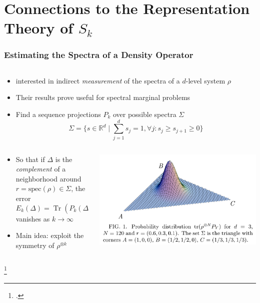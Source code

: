 \documentclass[
    9pt,
    hyperref={bookmarks=false, colorlinks=false}, %
    xcolor={dvipsnames},
]{beamer}
\DeclareMathOperator{\Tr}{Tr}
\begin{document}
\section{Connections to the Representation Theory of $S_k$}
\begin{frame}
    \frametitle{Estimating the Spectra of a Density Operator}
    \begin{columns}
        \begin{column}{\textwidth}
            \begin{itemize}
                \item \citeauthor{keyl2005estimating}\footnotemark{} interested in indirect \textit{measurement} of the spectra of a $d$-level system $\rho$
                \item Their results prove useful for spectral marginal problems
                \item Find a sequence projections $P_k$ over possible spectra $\Sigma$
                    \[ \Sigma = \{ s \in \mathbb R^d \mid \sum_{j=1}^{d} s_j = 1, \forall j : s_j \geq s_{j+1} \geq 0\} \]
            \end{itemize}
        \end{column}
    \end{columns}
    \begin{columns}
        \begin{column}{0.5\textwidth}
            \begin{itemize}
                \item So that if $\Delta$ is the \textit{complement} of a neighborhood around $r = \mathrm{spec}(\rho) \in \Sigma$, the error
                    \[ E_k(\Delta) = \Tr(P_k(\Delta) \rho^{\otimes k}) \]
                vanishes as $k \to \infty$
                \item Main idea: exploit the symmetry of $\rho^{\otimes k}$
            \end{itemize}
        \end{column}
        \begin{column}{0.5\textwidth}
            \includegraphics[width=\textwidth]{figures/keyl_werner.png}
        \end{column}
    \end{columns}
    \footcitetext{keyl2005estimating} 
\end{frame}
\end{document}
